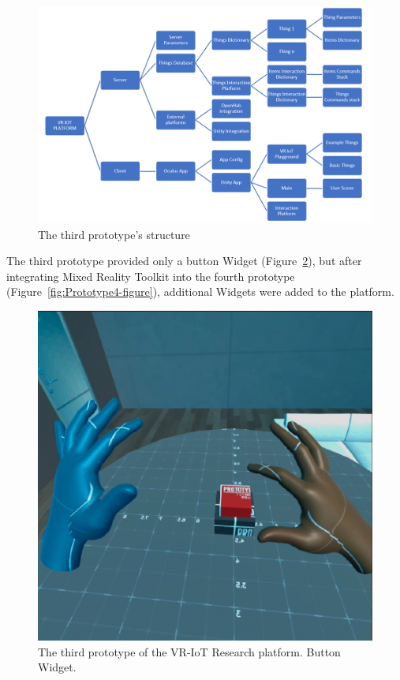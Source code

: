\begin{figure}
  \centering
  \includegraphics[width=0.9\linewidth]{figures/Prototype3Structure.png}
  \caption{The third prototype's structure}
  \label{fig:Prototype3Structure-figure}
\end{figure}

The third prototype provided only a button Widget (Figure~\ref{fig:Prototype3-figure}), but after integrating Mixed Reality Toolkit into the fourth prototype (Figure~\ref{fig:Prototype4-figure}), additional Widgets were added to the platform. 

\begin{figure}
  \centering
  \includegraphics[width=0.6\linewidth]{figures/Prototype3.png}
  \caption{The third prototype of the VR-IoT Research platform. Button Widget.}
  \label{fig:Prototype3-figure}
\end{figure}

